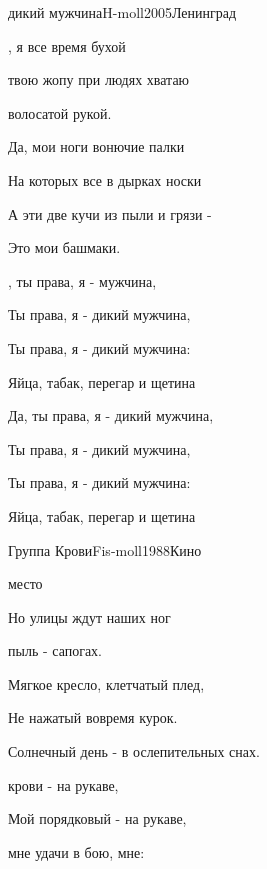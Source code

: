 \documentclass[a4paper,draft]{book}
\begin{document}
\begin{otherlanguage}{russian}
\begin{song}{дикий мужчина}{H-moll}{2005}{Ленинград}{}{}
\begin{SBVerse}
	, я все время бухой

	 твою жопу при людях хватаю

	 волосатой рукой.
	\end{SBVerse}

	\begin{SBVerse}
	Да, мои ноги вонючие палки

	На которых все в дырках носки

	А эти две кучи из пыли и грязи -

	Это мои башмаки.
	\end{SBVerse}

	\begin{SBChorus}
	, ты права, я -  мужчина,

	Ты права, я - дикий мужчина,

	Ты права, я - дикий мужчина:

	Яйца, табак, перегар и щетина
	\end{SBChorus}

	\begin{SBChorus}
	Да, ты права, я - дикий мужчина,

	Ты права, я - дикий мужчина,

	Ты права, я - дикий мужчина:

	Яйца, табак, перегар и щетина
	\end{SBChorus}
\end{song}

\begin{song}{Группа Крови}{Fis-moll}{1988}{Кино}{}{}

\begin{SBVerse}
	 место

	Но улицы ждут  наших ног

	 пыль -  сапогах.

	Мягкое кресло, клетчатый плед,

	Не нажатый вовремя курок.

	Солнечный день - в ослепительных снах.
\end{SBVerse}

\begin{SBChorus}
	 крови - на рукаве,

	Мой порядковый  - на рукаве,

	 мне удачи в бою,  мне:


\end{SBChorus}
\end{song}
\end{otherlanguage}
\end{document}
